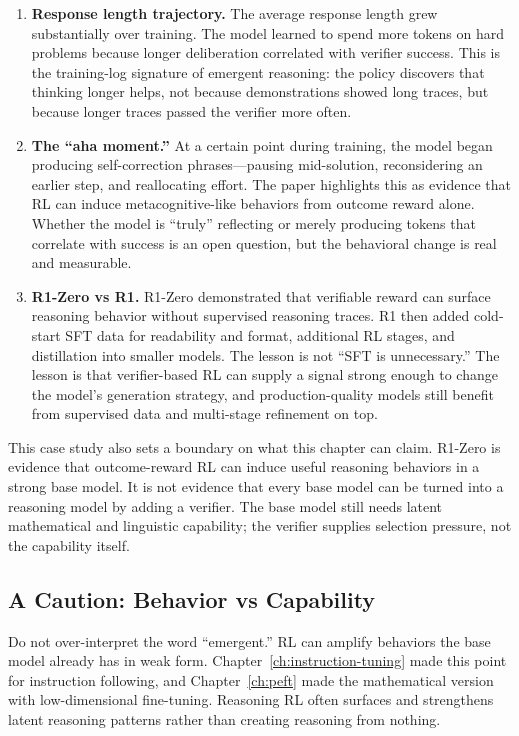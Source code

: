 \begin{enumerate}[nosep]
  \item \textbf{Response length trajectory.} The average response length grew substantially over training. The model learned to spend more tokens on hard problems because longer deliberation correlated with verifier success. This is the training-log signature of emergent reasoning: the policy discovers that thinking longer helps, not because demonstrations showed long traces, but because longer traces passed the verifier more often.
  \item \textbf{The ``aha moment.''} At a certain point during training, the model began producing self-correction phrases---pausing mid-solution, reconsidering an earlier step, and reallocating effort. The paper highlights this as evidence that RL can induce metacognitive-like behaviors from outcome reward alone. Whether the model is ``truly'' reflecting or merely producing tokens that correlate with success is an open question, but the behavioral change is real and measurable.
  \item \textbf{R1-Zero vs R1.} R1-Zero demonstrated that verifiable reward can surface reasoning behavior without supervised reasoning traces. R1 then added cold-start SFT data for readability and format, additional RL stages, and distillation into smaller models. The lesson is not ``SFT is unnecessary.'' The lesson is that verifier-based RL can supply a signal strong enough to change the model's generation strategy, and production-quality models still benefit from supervised data and multi-stage refinement on top.
\end{enumerate}

This case study also sets a boundary on what this chapter can claim. R1-Zero is evidence that outcome-reward RL can induce useful reasoning behaviors in a strong base model. It is not evidence that every base model can be turned into a reasoning model by adding a verifier. The base model still needs latent mathematical and linguistic capability; the verifier supplies selection pressure, not the capability itself.

\subsection{A Caution: Behavior vs Capability}

Do not over-interpret the word ``emergent.'' RL can amplify behaviors the base model already has in weak form. Chapter~\ref{ch:instruction-tuning} made this point for instruction following, and Chapter~\ref{ch:peft} made the mathematical version with low-dimensional fine-tuning. Reasoning RL often surfaces and strengthens latent reasoning patterns rather than creating reasoning from nothing.

